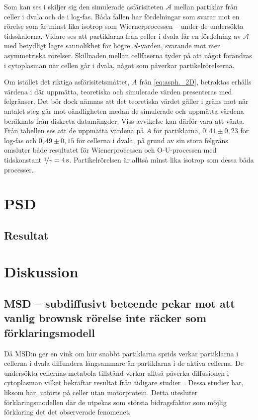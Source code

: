 Som kan ses i  skiljer sig den simulerade asfärisiteten $\mathcal{A}$ mellan partiklar från celler i dvala och de i log-fas. Båda fallen har fördelningar som svarar mot en rörelse som är minst lika isotrop som Wiernerprocessen -- under de undersökta tidsskalorna. Vidare ses att partiklarna från celler i dvala får en fördelning av $\mathcal{A}$ med betydligt lägre sannolikhet för högre $\mathcal{A}$-värden, svarande mot mer asymmetriska rörelser. Skillnaden mellan cellfaserna tyder på att något förändras i cytoplasman när cellen går i dvala, något som påverkar partikelrörelserna. 

Om istället det riktiga asfärisitetsmåttet, $A$ från \eqref{eq:asph._2D}, betraktas erhålls värdena i  där uppmätta, teoretiska och simulerade värden presenteras med felgränser. Det bör dock nämnas att det teoretiska värdet gäller i gräns mot när antalet steg går mot oändligheten medan de simulerade och uppmätta värdena beräknats från diskreta datamängder. Viss avvikelse kan därför vara att vänta. Från tabellen ses att de uppmätta värdena på $A$ för partiklarna, $0,41\pm0,23$ för log-fas och $0,49\pm0,15$ för cellerna i dvala, på grund av sin stora felgräns omsluter både resultatet för Wienerprocessen och O-U-processen med tidskonstant $\nicefrac{1}{\gamma}=\unit[4]{s}$. Partikelrörelsen är alltså minst lika isotrop som dessa båda processer.

\section{PSD}


\subsection{Resultat}


\section{Diskussion}


\subsection{MSD -- subdiffusivt beteende pekar mot att vanlig brownsk rörelse inte räcker som förklaringsmodell}
Då MSD:n ger en vink om hur snabbt partiklarna sprids verkar partiklarna i cellerna i dvala diffundera långsammare än partiklarna i de aktiva cellerna. De undersökta cellernas metabola tillstånd verkar alltså påverka diffusionen i cytoplasman vilket bekräftar resultat från tidigare studier~\cite{Parry_etal2014}. Dessa studier har, liksom här, utförts på celler utan motorprotein. Detta utesluter förklaringsmodellen där de utpekas som största bidragsfaktor som möjlig förklaring det det observerade fenomenet. 




